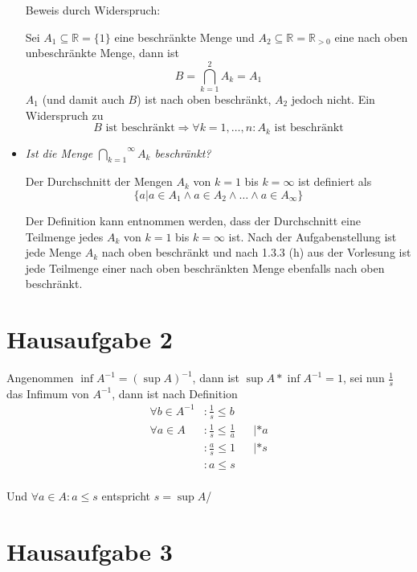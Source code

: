 \documentclass{article}
\begin{document}
\begin{itemize}
  Beweis durch Widerspruch:
  
  Sei $A_1 \subseteq \mathbb{R} = \{ 1 \}$ eine beschränkte Menge und $A_2 \subseteq \mathbb{R} = \mathbb{R}_{> 0}$
  eine nach oben unbeschränkte Menge, dann ist
  \[
    B = \bigcap_{k = 1}^{2} A_k = A_1
  \]
  $A_1$ (und damit auch $B$) ist nach oben beschränkt, $A_2$ jedoch nicht. Ein Widerspruch zu
  \[
    B \text{ ist beschränkt} \Rightarrow \forall k = 1, \ldots, n \colon A_k \text{ ist beschränkt}
  \]

\item \emph{Ist die Menge $\overset{\infty}{\underset{k = 1}{\bigcap}} A_k$ beschränkt?}

  Der Durchschnitt der Mengen $A_k$ von $k = 1$ bis $k = \infty$ ist definiert als
  \[
    \{ a | a \in A_1 \land a \in A_2 \land \ldots \land a \in A_\infty \}
  \]

  Der Definition kann entnommen werden, dass der Durchschnitt eine Teilmenge jedes $A_k$ von $k = 1$ bis $k = \infty$
  ist. Nach der Aufgabenstellung ist jede Menge $A_k$ nach oben beschränkt und nach 1.3.3 (h) aus der Vorlesung
  ist jede Teilmenge einer nach oben beschränkten Menge ebenfalls nach oben beschränkt.
  
\end{itemize}

\section*{Hausaufgabe 2}

Angenommen $\inf A^{-1} = (\sup A)^{-1}$, dann ist $\sup A * \inf A^{-1} = 1$, 
sei nun $\frac{1}{s}$ das Infimum von $A^{-1}$, dann ist nach Definition
\begin{align*}
  \forall b \in A^{-1} &\colon \frac{1}{s} \leq b \\
  \forall a \in A      &\colon \frac{1}{s} \leq \frac{1}{a}  && | *a \\
                       &\colon \frac{a}{s} \leq 1            && | *s \\
                       &\colon a \leq s \\
\end{align*}

Und $\forall a \in A \colon a \leq s$ entspricht $s = \sup A$/

\section*{Hausaufgabe 3}
\end{document}

